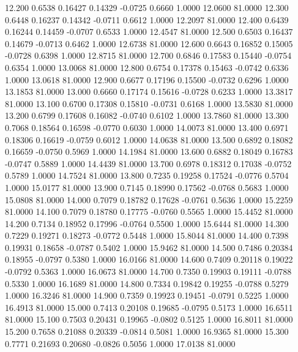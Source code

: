  12.200   0.6538   0.16427   0.14329  -0.0725   0.6660   1.0000  12.0600  81.0000
  12.300   0.6448   0.16237   0.14342  -0.0711   0.6612   1.0000  12.2097  81.0000
  12.400   0.6439   0.16244   0.14459  -0.0707   0.6533   1.0000  12.4547  81.0000
  12.500   0.6503   0.16437   0.14679  -0.0713   0.6462   1.0000  12.6738  81.0000
  12.600   0.6643   0.16852   0.15005  -0.0728   0.6398   1.0000  12.8715  81.0000
  12.700   0.6846   0.17583   0.15440  -0.0754   0.6354   1.0000  13.0068  81.0000
  12.800   0.6754   0.17378   0.15463  -0.0742   0.6336   1.0000  13.0618  81.0000
  12.900   0.6677   0.17196   0.15500  -0.0732   0.6296   1.0000  13.1853  81.0000
  13.000   0.6660   0.17174   0.15616  -0.0728   0.6233   1.0000  13.3817  81.0000
  13.100   0.6700   0.17308   0.15810  -0.0731   0.6168   1.0000  13.5830  81.0000
  13.200   0.6799   0.17608   0.16082  -0.0740   0.6102   1.0000  13.7860  81.0000
  13.300   0.7068   0.18564   0.16598  -0.0770   0.6030   1.0000  14.0073  81.0000
  13.400   0.6971   0.18306   0.16619  -0.0759   0.6012   1.0000  14.0638  81.0000
  13.500   0.6892   0.18082   0.16659  -0.0750   0.5969   1.0000  14.1984  81.0000
  13.600   0.6882   0.18049   0.16783  -0.0747   0.5889   1.0000  14.4439  81.0000
  13.700   0.6978   0.18312   0.17038  -0.0752   0.5789   1.0000  14.7524  81.0000
  13.800   0.7235   0.19258   0.17524  -0.0776   0.5704   1.0000  15.0177  81.0000
  13.900   0.7145   0.18990   0.17562  -0.0768   0.5683   1.0000  15.0808  81.0000
  14.000   0.7079   0.18782   0.17628  -0.0761   0.5636   1.0000  15.2259  81.0000
  14.100   0.7079   0.18780   0.17775  -0.0760   0.5565   1.0000  15.4452  81.0000
  14.200   0.7134   0.18952   0.17996  -0.0764   0.5500   1.0000  15.6444  81.0000
  14.300   0.7229   0.19271   0.18273  -0.0772   0.5448   1.0000  15.8044  81.0000
  14.400   0.7398   0.19931   0.18658  -0.0787   0.5402   1.0000  15.9462  81.0000
  14.500   0.7486   0.20384   0.18955  -0.0797   0.5380   1.0000  16.0166  81.0000
  14.600   0.7409   0.20118   0.19022  -0.0792   0.5363   1.0000  16.0673  81.0000
  14.700   0.7350   0.19903   0.19111  -0.0788   0.5330   1.0000  16.1689  81.0000
  14.800   0.7334   0.19842   0.19255  -0.0788   0.5279   1.0000  16.3246  81.0000
  14.900   0.7359   0.19923   0.19451  -0.0791   0.5225   1.0000  16.4913  81.0000
  15.000   0.7413   0.20108   0.19685  -0.0795   0.5173   1.0000  16.6511  81.0000
  15.100   0.7503   0.20431   0.19965  -0.0802   0.5125   1.0000  16.8011  81.0000
  15.200   0.7658   0.21088   0.20339  -0.0814   0.5081   1.0000  16.9365  81.0000
  15.300   0.7771   0.21693   0.20680  -0.0826   0.5056   1.0000  17.0138  81.0000
